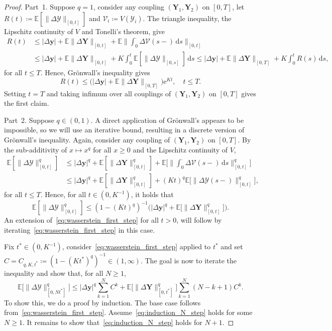 \documentclass[en,oneside,bbfont,article]{amsart}
\theoremstyle{remark}
\theoremstyle{definition}
\theoremstyle{definition}
\newcommand\Y{\bm{\mathcal{Y}}}
\newcommand{\V}{\bm{\mathcal{V}}}
\newcommand\E{\mathds{E}}
\newcommand\e{\mathord{\mathrm{e}}}
\newcommand\1{\mathds{1}}
\renewcommand\le{\leqslant}
\renewcommand\ge{\geqslant}
\newcommand{\D}{\mathrm{d}}
\begin{document}
\begin{proof}
Part~1. Suppose $q=1$, consider any coupling $(\bm{Y}_1,\bm{Y}_2)$ on $[0,T]$, let $R(t)\coloneqq \E[\|\Delta\Y\|_{[0,t]}]$ and $\V_i\coloneqq V(\Y_i)$. The triangle inequality, the Lipschitz continuity of $V$ and Tonelli's theorem, give
\begin{align*}
R(t) &\le |\Delta\bm{y}|+ \E\|\Delta\bm{Y}\|_{[0,t]}
+\E\bigg\| \int_0^\cdot \Delta\V(s-)\,\D s \bigg\|_{[0,t]} \\
&\le |\Delta\bm{y}|+ \E\|\Delta\bm{Y}\|_{[0,t]} + K \int_0^t \E[\|\Delta\Y\|_{[0,s]}]\, \D s
\le|\Delta\bm{y}| + \E\|\Delta\bm{Y}\|_{[0,T]} + K \int_0^t R(s)\, \D s,
\end{align*} 
for all $t\le T$. Hence, Gr\"onwall's inequality gives
\[
R(t) \le \big(|\Delta\bm{y}|
+ \E\|\Delta\bm{Y}\|_{[0,T]}\big) \e^{Kt},
\quad t\le T.
\]
Setting $t=T$ and taking infimum over all couplings of $(\bm{Y}_1,\bm{Y}_2)$ on $[0,T]$ gives the first claim.

Part~2. Suppose $q \in (0,1)$. A direct application of Gr\"onwall's appears to be impossible, so we will use an iterative bound, resulting in a discrete version of Gr\"onwall's inequality. Again, consider any coupling of $(\bm{Y}_1,\bm{Y}_2)$ on $[0,T]$. By the sub-additivity of $x \mapsto x^q$ for all $x \ge 0$ and the Lipschitz continuity of $V$, 
\begin{align*}
\E[\|\Delta\Y\|_{[0,t]}^q] 
&\le |\Delta\bm{y}|^q
+\E[\|\Delta\bm{Y}\|_{[0,t]}^q] 
+ \E\Bigg[\bigg\|\int_0^\cdot \Delta\V(s-) \,\D s \bigg\|^q_{[0,t]}\Bigg]\\
&\le |\Delta\bm{y}|^q
+\E[\|\Delta\bm{Y}\|_{[0,t]}^q] 
+ (Kt)^q \E\big[\|\Delta\Y(s-)\|^q_{[0,t]}\big], 
\end{align*} 
for all $t\le T$. Hence, for all $t\in (0,K^{-1})$, it holds that
\begin{equation}\label{eq:wasserstein_first_step}
\E[\|\Delta\Y\|_{[0,t]}^q] 
\le (1-(Kt)^q)^{-1} \big(|\Delta\bm{y}|^q 
+ \E\big[\|\Delta\bm{Y}\|_{[0,t]}^q\big]\big).
\end{equation} 
An extension of~\eqref{eq:wasserstein_first_step} for all $t>0$, will follow by iterating~\eqref{eq:wasserstein_first_step} in this case. 

Fix $t^* \in (0,K^{-1})$, consider~\eqref{eq:wasserstein_first_step} applied to $t^*$ and set $C = C_{q,K,t^*} \coloneqq (1-(Kt^*)^q)^{-1} \in (1,\infty)$. The goal is now to iterate the inequality and show that, for all $N \ge 1$,
\begin{equation}\label{eq:induction_N_step}
\E\big[\|\Delta\Y\|_{[0,Nt^*]}^q\big]
\le |\Delta\bm{y}|^q \sum_{k=1}^N C^k + \E\big[\|\Delta\bm{Y}\|_{[0,t^*]}^q\big] \sum_{k=1}^N (N-k+1)C^k.
\end{equation} 
To show this, we do a proof by induction. The base case follows from~\eqref{eq:wasserstein_first_step}. Assume~\eqref{eq:induction_N_step} holds for some $N\ge 1$. It remains to show that~\eqref{eq:induction_N_step} holds for $N+1$. 


\end{proof}
\end{document}
